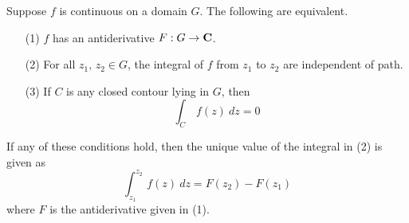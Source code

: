 \medskip

\begin{theorem}\label{FTCoCI}
Suppose $f$ is continuous on a domain $G$. The following are equivalent. 
\begin{itemize}
\item[(1)] $f$ has an antiderivative $F: G \to \mathbf C$. 
\item[(2)] For all $z_1,\,z_2 \in G$, the integral of $f$ from $z_1$ to $z_2$ are independent of path.
\item[(3)] If $C$ is any closed contour lying in $G$, then
\[\int_C\,f(z)\ dz = 0\]
\end{itemize}
If any of these conditions hold, then the unique value of the integral in (2) is given as
\[\int_{z_1}^{z_2}\,f(z)\ dz = F(z_2) - F(z_1)\]
where $F$ is the antiderivative given in (1).
\end{theorem}
